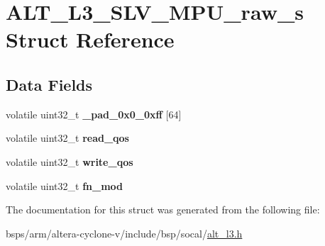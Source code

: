 \hypertarget{structALT__L3__SLV__MPU__raw__s}{}\section{A\+L\+T\+\_\+\+L3\+\_\+\+S\+L\+V\+\_\+\+M\+P\+U\+\_\+raw\+\_\+s Struct Reference}
\label{structALT__L3__SLV__MPU__raw__s}
\subsection*{Data Fields}
\begin{DoxyCompactItemize}
\item 
\mbox{\label{structALT__L3__SLV__MPU__raw__s_a4072c24fbe541587dbeb8dd7defccaa0}} 
volatile uint32\+\_\+t {\bfseries \+\_\+pad\+\_\+0x0\+\_\+0xff} \mbox{[}64\mbox{]}
\item 
\mbox{\label{structALT__L3__SLV__MPU__raw__s_a87678e80a1492ecfd6b8f4fc9cc32293}} 
volatile uint32\+\_\+t {\bfseries read\+\_\+qos}
\item 
\mbox{\label{structALT__L3__SLV__MPU__raw__s_a45e12f815d3876537715723fa74f3024}} 
volatile uint32\+\_\+t {\bfseries write\+\_\+qos}
\item 
\mbox{\label{structALT__L3__SLV__MPU__raw__s_ae5ebb32db491ceb7a24238064218d78b}} 
volatile uint32\+\_\+t {\bfseries fn\+\_\+mod}
\end{DoxyCompactItemize}


The documentation for this struct was generated from the following file\+:\begin{DoxyCompactItemize}
\item 
bsps/arm/altera-\/cyclone-\/v/include/bsp/socal/\mbox{\hyperlink{alt__l3_8h}{alt\+\_\+l3.\+h}}\end{DoxyCompactItemize}
